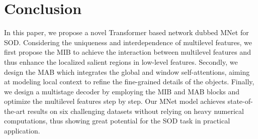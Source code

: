 \documentclass[lettersize,journal]{IEEEtran}
\begin{document}
\section{Conclusion}
In this paper, we propose a novel Transformer based network dubbed MNet for SOD. Considering the uniqueness and interdependence of multilevel features, we first propose the MIB to achieve the interaction between multilevel features and thus enhance the localized salient regions in low-level features. Secondly, we design the MAB which integrates the global and window self-attentions, aiming at modeling local context to refine the fine-grained details of the objects. Finally, we design a multistage decoder by employing the MIB and MAB blocks and optimize the multilevel features step by step. Our MNet model achieves state-of-the-art results on six challenging datasets without relying on heavy numerical computations, thus showing great potential for the SOD task in practical application. 











\vfill
\end{document}
